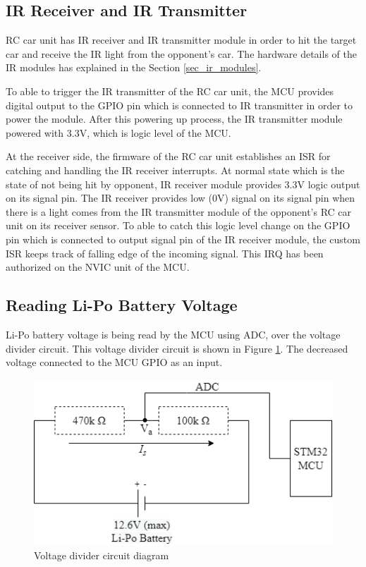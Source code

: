 \subsection{IR Receiver and IR Transmitter} \label{sec_ir_rx_tx}

RC car unit has IR receiver and IR transmitter module in order to hit the target car and receive the IR light from the opponent's car. The hardware details of the IR modules has explained in the Section \ref{sec_ir_modules}. 

To able to trigger the IR transmitter of the RC car unit, the MCU provides digital output to the GPIO pin which is connected to IR transmitter in order to power the module. After this powering up process, the IR transmitter module powered with 3.3V, which is logic level of the MCU.

At the receiver side, the firmware of the RC car unit establishes an ISR for catching and handling the IR receiver interrupts. At normal state which is the state of not being hit by opponent, IR receiver module provides 3.3V logic output on its signal pin. The IR receiver provides low (0V) signal on its signal pin when there is a light comes from the IR transmitter module of the opponent's RC car unit on its receiver sensor. To able to catch this logic level change on the GPIO pin which is connected to output signal pin of the IR receiver module, the custom ISR keeps track of falling edge of the incoming signal. This IRQ has been authorized on the NVIC unit of the MCU.

\subsection{Reading Li-Po Battery Voltage} \label{sec_read_lipo_voltage}

Li-Po battery voltage is being read by the MCU using ADC, over the voltage divider circuit. This voltage divider circuit is shown in Figure \ref{fig:voltage_divider_circuit}. The decreased voltage connected to the MCU GPIO as an input.

\begin{figure}[!htbp]
    \centering
\includegraphics[width=1\textwidth]{Imgs/voltage_divider.drawio.png}
    \caption{\label{fig:voltage_divider_circuit}Voltage divider circuit diagram}
\end{figure}

